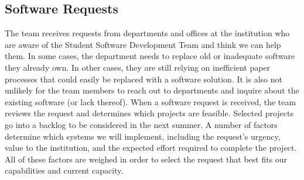 

\subsection{Software Requests}
The team receives requests from departments and offices at the institution who are aware of the Student Software Development Team and think we can help them. In some cases, the department needs to replace old or inadequate software they already own. In other cases, they are still relying on inefficient paper processes that could easily be replaced with a software solution. It is also not unlikely for the team members to reach out to departments and inquire about the existing software (or lack thereof).  When a software request is received, the team reviews the request and determines which projects are feasible. Selected projects go into a backlog to be considered in the next summer. A number of factors determine which systems we will implement, including the request's urgency, value to the institution, and the expected effort required to complete the project. All of these factors are weighed in order to select the request that best fits our capabilities and current capacity.

